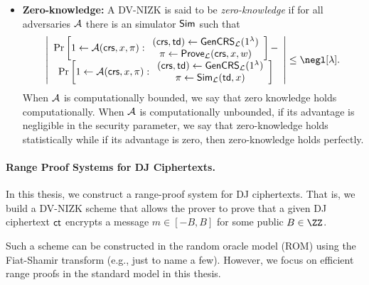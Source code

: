 \begin{definition}[DV-NIZK]
\begin{itemize}
\item \textbf{Zero-knowledge:} A DV-NIZK is said to be \emph{zero-knowledge} if  for all adversaries $\mathcal{A}$ there is an simulator $\mathsf{Sim}$ such that $$\left|
\begin{array}{c}
\Pr\left[1\leftarrow\Ac(\crs,x,\pi):\begin{array}{c}
     (\crs,\td)\leftarrow\mathsf{GenCRS}_\Lc(1^\lambda)  \\
     \pi\leftarrow\mathsf{Prove}_\Lc(\crs,x,w) 
\end{array}\right] -
\\ \Pr\left[1\leftarrow\Ac(\crs,x,\pi):\begin{array}{c}
     (\crs,\td)\leftarrow\mathsf{GenCRS}_\Lc(1^\lambda)  \\
     \pi\leftarrow\Sim_\Lc(\td,x) 
\end{array}\right] \end{array}
\right|\leq \negl[\lambda].$$ When $\mathcal{A}$ is computationally bounded, we say that zero knowledge holds computationally. When $\mathcal{A}$ is computationally unbounded, if its advantage is negligible in the security parameter, we say that zero-knowledge holds statistically while if its advantage is zero, then zero-knowledge holds perfectly.
\end{itemize}

\end{definition}


\paragraph{Range Proof Systems for DJ Ciphertexts.} In this thesis, we construct a range-proof system for DJ ciphertexts. That is, we build a DV-NIZK scheme that allows the prover to prove that a given DJ ciphertext $\mathsf{ct}$ encrypts a message $m\in [-B, B]$ for some public $B\in\ZZ$. 

Such a scheme can be constructed in the random oracle model (ROM) using the Fiat-Shamir transform  (e.g., \cite{PKC:DamJur01,C:BBCdGL18,SP:BBBPWM18,CCS:TBMDKS20} just to name a few). However, we focus on efficient range proofs in the standard model in this thesis.  


